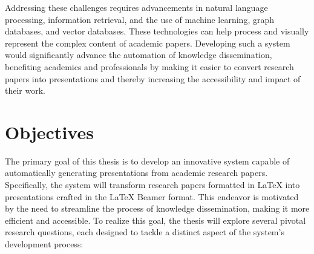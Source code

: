 Addressing these challenges requires advancements in natural language processing, information retrieval, and the use of machine learning, graph databases, and vector databases. These technologies can help process and visually represent the complex content of academic papers. Developing such a system would significantly advance the automation of knowledge dissemination, benefiting academics and professionals by making it easier to convert research papers into presentations and thereby increasing the accessibility and impact of their work.

\section{Objectives}
\label{sec:intro:objectives}


The primary goal of this thesis is to develop an innovative system capable of automatically generating presentations from academic research papers. Specifically, the system will transform research papers formatted in \LaTeX{} into presentations crafted in the \LaTeX{} Beamer format. This endeavor is motivated by the need to streamline the process of knowledge dissemination, making it more efficient and accessible. To realize this goal, the thesis will explore several pivotal research questions, each designed to tackle a distinct aspect of the system's development process:

